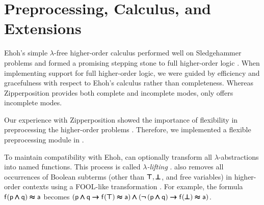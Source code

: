 



\section{Preprocessing, Calculus, and Extensions}

\label{sec:ehoh2:calculus}

Ehoh's simple $\lambda$-free higher-order calculus performed well on
Sledgehammer problems and formed a promising stepping stone to full higher-order
logic \cite{section-ehoh}. When implementing support for full higher-order
logic, we were guided by efficiency and gracefulness with respect to Ehoh's calculus rather
than completeness. Whereas Zipperposition provides both complete and incomplete
modes, \ehohii{} only offers incomplete modes.

 Our experience with Zipperposition showed the importance
of flexibility in preprocessing the higher-order problems
\cite{section-making-ho-work}. Therefore, we implemented a flexible
preprocessing module in \ehohii{}. 

To maintain compatibility with Ehoh, \ehohii{} can optionally transform all
$\lambda$-abstractions into named functions. This process is called
\emph{$\lambda$-lifting} \cite{rjmh-82-lifting}. \ehohii{} also removes all
occurrences of Boolean subterms (other than $\pmb\top, \pmb\bot$, and free variables)
in higher-order contexts using a FOOL-like transformation \cite{kotelnikov-16-fool}.
For example, the formula $\mathsf{f}(\mathsf{p} \pmb\land \mathsf{q}) \pmb\approx \mathsf{a}$ becomes
$(\mathsf{p} \pmb\land \mathsf{q} \pmb\rightarrow \mathsf{f}(\pmb\top) \pmb\approx \mathsf{a}) \pmb\land
(\pmb{\neg\,}(\mathsf{p} \pmb\land \mathsf{q}) \pmb\rightarrow \mathsf{f}(\pmb\bot) \pmb\approx \mathsf{a})$.

